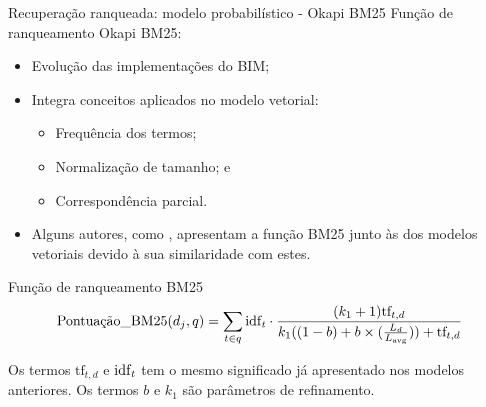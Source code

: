 \documentclass[%
  10pt,%
  aspectratio = 169,%
  compress,%
  t,%
]{beamer}%
\begin{document}
    \begin{frame}[fragile = singleslide]{}{Recuperação ranqueada: modelo probabilístico - Okapi BM25}
        Função de ranqueamento Okapi BM25:
        \begin{itemize}
            \item Evolução das implementações do BIM;
            \item Integra conceitos aplicados no modelo vetorial:
                \begin{itemize}
                    \item Frequência dos termos;
                    \item Normalização de tamanho; e
                    \item Correspondência parcial.
                \end{itemize}
            \item Alguns autores, como \cite[p.~111]{Zhai2016TDMA}, apresentam a função BM25 junto às dos modelos vetoriais devido à sua similaridade com estes.
        \end{itemize}
  
        \begin{block}{Função de ranqueamento BM25}
            \begin{equation}
                \label{eq:okapi-bm25}
        		\text{Pontuação\_BM25}(d_j, q) = \sum_{t \in q} \text{idf}_{\text{\textit{t}}} 
        		\cdot
        		\frac{(k_1 + 1) \text{tf}_{t,d}}{k_1((1-b)+b \times (\frac{L_d}{L_{\text{avg}}})) + \text{tf}_{t,d}} 
            \end{equation}
        \end{block}
        Os termos $\text{tf}_{t,d}$ e $\text{idf}_{\text{\textit{t}}}$ tem o mesmo significado já apresentado nos modelos anteriores.
        Os termos $b$ e $k_1$ são parâmetros de refinamento. 
    \end{frame}
    
\end{document}
